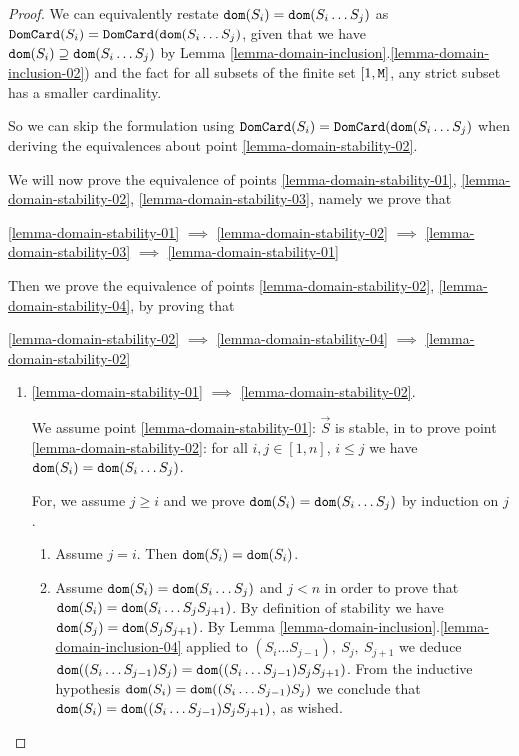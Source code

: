 \documentclass{lmcs}
\begin{document}
\begin{proof}
We can equivalently restate ${\tt dom}(S_i) =  {\tt dom}(S_i \ldots S_j)$ as
${\tt DomCard}(S_i) = {\tt DomCard}({\tt dom}(S_i \ldots S_j)$, 
given that we have ${\tt dom}(S_i) \supseteq  {\tt dom}(S_i \ldots S_j)$ 
by Lemma \ref{lemma-domain-inclusion}.\ref{lemma-domain-inclusion-02})
and the fact for all subsets of the finite set $[1,{\tt M}]$, any
strict subset has a smaller cardinality.

So we can skip the formulation using 
${\tt DomCard}(S_i) = {\tt DomCard}({\tt dom}(S_i \ldots S_j)$
when deriving the equivalences about point \ref{lemma-domain-stability-02}.

We will now prove the equivalence of points 
\ref{lemma-domain-stability-01},
\ref{lemma-domain-stability-02},
\ref{lemma-domain-stability-03},
namely we prove that
\begin{center}
\ref{lemma-domain-stability-01} 
$\implies$ 
\ref{lemma-domain-stability-02}
$\implies$ 
\ref{lemma-domain-stability-03} 
$\implies$ 
\ref{lemma-domain-stability-01}
\end{center}
Then we prove the equivalence of points
\ref{lemma-domain-stability-02},
\ref{lemma-domain-stability-04},
by proving that 
\begin{center}
\ref{lemma-domain-stability-02} $\implies$  
\ref{lemma-domain-stability-04} $\implies$  
\ref{lemma-domain-stability-02}
\end{center}


\begin{enumerate}

\item
\ref{lemma-domain-stability-01} $\implies$ \ref{lemma-domain-stability-02}.

We assume point \ref{lemma-domain-stability-01}: $\vec{S}$ is stable, in to prove 
point \ref{lemma-domain-stability-02}: 
for all $i, j \in [1, n]$, $i \le j$ we have ${\tt dom}(S_i) =  {\tt dom}(S_i \ldots S_j)$.

For, we assume $j \ge i$ and we prove ${\tt dom}(S_i) =  {\tt dom}(S_i \ldots S_j)$ by induction on $j$.
\begin{enumerate}
\item
Assume $j=i$. Then ${\tt dom}(S_i) =  {\tt dom}(S_i)$.
\item
Assume ${\tt dom}(S_i) =  {\tt dom}(S_i \ldots S_j)$ and $j<n$ in order to prove that 
${\tt dom}(S_i) =  {\tt dom}(S_i \ldots S_j S_{j+1})$. By definition of stability we have 
${\tt dom}(S_j) = {\tt dom}(S_j S_{j+1})$. By Lemma 
\ref{lemma-domain-inclusion}.\ref{lemma-domain-inclusion-04} 
applied to $(S_i \ldots S_{j-1}), \ S_j, \ S_{j+1}$ we deduce 
${\tt dom}( (S_i \ldots S_{j-1}) S_j) = {\tt dom}( (S_i \ldots S_{j-1}) S_j S_{j+1})$.
From the inductive hypothesis ${\tt dom}(S_i) =  {\tt dom}( (S_i \ldots S_{j-1}) S_j)$
we conclude that ${\tt dom}(S_i) =  {\tt dom}((S_i \ldots S_{j-1}) S_j S_{j+1})$, as wished.
\end{enumerate}



\end{enumerate}
\end{proof}
\end{document}
